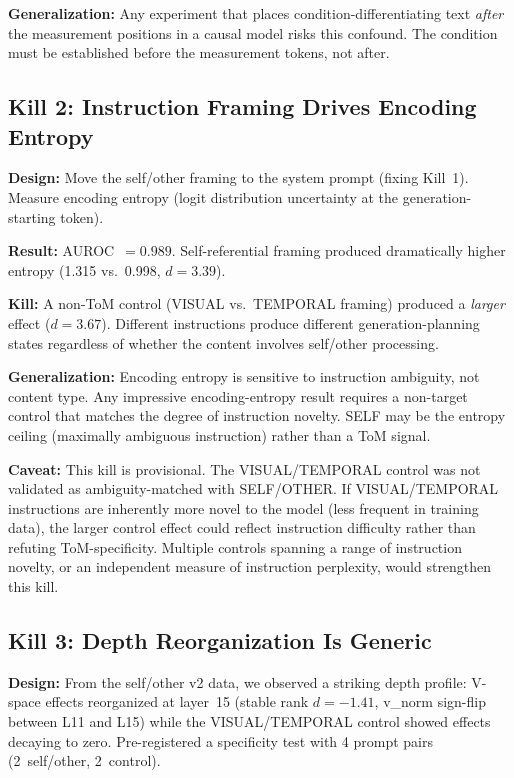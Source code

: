\documentclass[11pt,a4paper]{article}
\begin{document}
\textbf{Generalization:} Any experiment that places condition-differentiating
text \emph{after} the measurement positions in a causal model risks this
confound. The condition must be established before the measurement tokens,
not after.

\subsection{Kill 2: Instruction Framing Drives Encoding Entropy}
\label{sec:kill2}

\textbf{Design:} Move the self/other framing to the system prompt (fixing
Kill~1). Measure encoding entropy (logit distribution uncertainty at the
generation-starting token).

\textbf{Result:} AUROC~$= 0.989$. Self-referential framing produced
dramatically higher entropy (1.315 vs.\ 0.998, $d{=}3.39$).

\textbf{Kill:} A non-ToM control (VISUAL vs.\ TEMPORAL framing) produced a
\emph{larger} effect ($d{=}3.67$). Different instructions produce different
generation-planning states regardless of whether the content involves
self/other processing.

\textbf{Generalization:} Encoding entropy is sensitive to instruction
ambiguity, not content type. Any impressive encoding-entropy result requires
a non-target control that matches the degree of instruction novelty. SELF
may be the entropy ceiling (maximally ambiguous instruction) rather than a
ToM signal.

\textbf{Caveat:} This kill is provisional. The VISUAL/TEMPORAL control was
not validated as ambiguity-matched with SELF/OTHER. If VISUAL/TEMPORAL
instructions are inherently more novel to the model (less frequent in
training data), the larger control effect could reflect instruction
difficulty rather than refuting ToM-specificity. Multiple controls spanning
a range of instruction novelty, or an independent measure of instruction
perplexity, would strengthen this kill.

\subsection{Kill 3: Depth Reorganization Is Generic}
\label{sec:kill3}

\textbf{Design:} From the self/other v2 data, we observed a striking depth
profile: V-space effects reorganized at layer~15 (stable rank $d{=}{-}1.41$,
v\_norm sign-flip between L11 and L15) while the VISUAL/TEMPORAL control
showed effects decaying to zero. Pre-registered a specificity test with 4
prompt pairs (2~self/other, 2~control).
\end{document}

